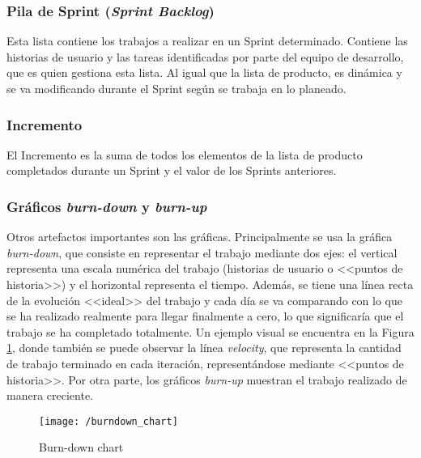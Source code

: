 \subsubsection{Pila de Sprint (\textit{Sprint Backlog})}
Esta lista \cite{Gomez2017} contiene los trabajos a realizar en un Sprint determinado. Contiene las historias de usuario y las tareas identificadas por parte del equipo de desarrollo, que es quien gestiona esta lista. Al igual que la lista de producto, es dinámica y se va modificando durante el Sprint según se trabaja en lo planeado.

\subsubsection{Incremento}
El Incremento \cite{Schwaber2017} es la suma de todos los elementos de la lista de producto completados durante un Sprint y el valor de los Sprints anteriores.

\subsubsection{Gráficos \textit{burn-down} y \textit{burn-up}}
Otros artefactos importantes son las gráficas. Principalmente se usa la gráfica \textit{burn-down}, que  consiste en representar el trabajo mediante dos ejes: el vertical representa una escala numérica del trabajo (historias de usuario o <<puntos de historia>>) y el horizontal representa el tiempo. Además, se tiene una línea recta de la evolución <<ideal>> del trabajo y cada día se va comparando con lo que se ha realizado realmente para llegar finalmente a cero, lo que significaría que el trabajo se ha completado totalmente. Un ejemplo visual se encuentra en la Figura \ref{fig:burndown}, donde también se puede observar la línea \textit{velocity}, que representa la cantidad de trabajo terminado en cada iteración, representándose mediante <<puntos de historia>>. Por otra parte, los gráficos \textit{burn-up} muestran el trabajo realizado de manera creciente.

\begin{figure}[!h]
	\begin{center}
		\texttt{[image: /burndown\_chart]}
		\caption{Burn-down chart}
		\label{fig:burndown}
	\end{center}
\end{figure}

\newpage

